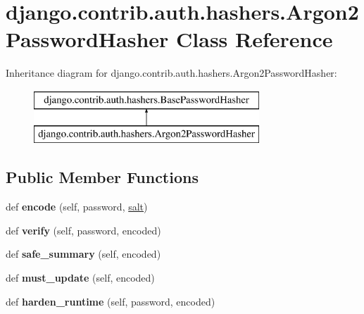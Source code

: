 \hypertarget{classdjango_1_1contrib_1_1auth_1_1hashers_1_1_argon2_password_hasher}{}\section{django.\+contrib.\+auth.\+hashers.\+Argon2\+Password\+Hasher Class Reference}
\label{classdjango_1_1contrib_1_1auth_1_1hashers_1_1_argon2_password_hasher}
Inheritance diagram for django.\+contrib.\+auth.\+hashers.\+Argon2\+Password\+Hasher\+:\begin{figure}[H]
\begin{center}
\leavevmode
\includegraphics[height=2.000000cm]{classdjango_1_1contrib_1_1auth_1_1hashers_1_1_argon2_password_hasher}
\end{center}
\end{figure}
\subsection*{Public Member Functions}
\begin{DoxyCompactItemize}
\item 
\mbox{\label{classdjango_1_1contrib_1_1auth_1_1hashers_1_1_argon2_password_hasher_a5927c1af2a1eff8fb851e8db8f1b3e4a}} 
def {\bfseries encode} (self, password, \mbox{\hyperlink{classdjango_1_1contrib_1_1auth_1_1hashers_1_1_base_password_hasher_a6761698d81d6070e4aa046fe6b7116f7}{salt}})
\item 
\mbox{\label{classdjango_1_1contrib_1_1auth_1_1hashers_1_1_argon2_password_hasher_ae6d55f8b4a5e80d586aadf3b5d7620b2}} 
def {\bfseries verify} (self, password, encoded)
\item 
\mbox{\label{classdjango_1_1contrib_1_1auth_1_1hashers_1_1_argon2_password_hasher_aa77f13124f2eec8b05093fd4edf9f8aa}} 
def {\bfseries safe\+\_\+summary} (self, encoded)
\item 
\mbox{\label{classdjango_1_1contrib_1_1auth_1_1hashers_1_1_argon2_password_hasher_ac0da9904d51a59d632ab5f8baf014704}} 
def {\bfseries must\+\_\+update} (self, encoded)
\item 
\mbox{\label{classdjango_1_1contrib_1_1auth_1_1hashers_1_1_argon2_password_hasher_af8f9435c1d386713debdd4a675986a12}} 
def {\bfseries harden\+\_\+runtime} (self, password, encoded)
\end{DoxyCompactItemize}
